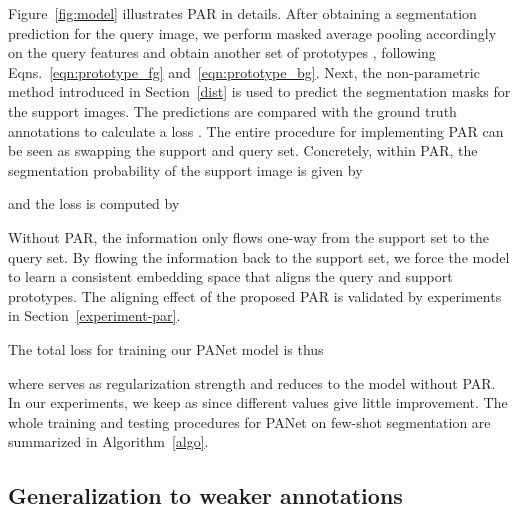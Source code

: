 \documentclass[10pt,twocolumn,letterpaper]{article}
\begin{document}
Figure~\ref{fig:model} illustrates PAR in details. After obtaining a segmentation prediction for the query image, we perform masked average pooling accordingly on the query features and obtain  another set of prototypes , following Eqns.~\eqref{eqn:prototype_fg} and~\eqref{eqn:prototype_bg}. Next, the non-parametric method introduced in Section~\ref{dist} is used to predict the segmentation masks for the support images. The predictions are compared with the ground truth annotations to calculate a loss . The entire procedure for implementing  PAR can be seen as swapping the support and query set. Concretely, within PAR, the segmentation probability of the support image  is given by

and the loss  is computed by

Without PAR, the information only flows one-way from the support set to the query set. By flowing the information back to the support set, we force the model to learn a consistent embedding space that aligns the query and support prototypes. The aligning effect of the proposed PAR is validated by experiments in Section~\ref{experiment-par}.


The total loss for training our PANet model is thus

where  serves as regularization strength and  reduces to the model without PAR. In our experiments, we keep  as  since different values give little improvement. The whole training and testing procedures for PANet on few-shot segmentation are summarized in Algorithm~\ref{algo}.



\subsection{Generalization to weaker annotations}
\end{document}
